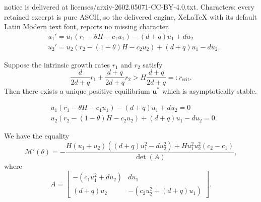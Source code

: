 \documentclass[10pt,a4paper]{amsart}
\def\MM{\mathcal{M}}
\begin{document}
notice is delivered at licenses/arxiv-2602.05071-CC-BY-4.0.txt. Characters: every retained excerpt is pure ASCII, so the delivered engine, XeLaTeX with its default Latin Modern text font, reports no missing character.
\begin{align}\label{eqn:ODEs_2patch}
    &u_1'=u_1(r_1-\theta H -c_1u_1) -(d+q)u_1+du_2\nonumber\\
    &u_2'=u_2(r_2-(1-\theta)H -c_2u_2)+(d+q)u_1-du_2.
\end{align}

\begin{lemma}\label{lem:persist}
    Suppose the intrinsic growth rates $r_1$ and $r_2$ satisfy
    \[
    \frac{d}{2d+q}r_1+\frac{d+q}{2d+q}r_2>H\frac{d+q}{2d+q} =: r_{\text{crit}}.
    \]
    Then there exists a unique  positive equilibrium $\bm u^*$ which is asymptotically stable.
\end{lemma}

\begin{align}
    &u_1(r_1-\theta H -c_1u_1) -(d+q)u_1+du_2=0\label{eqn:u1}\\
    &u_2(r_2-(1-\theta)H -c_2u_2)+(d+q)u_1-du_2=0\label{eqn:u2}.
\end{align}    

\begin{lemma}\label{lem:M'_hetero}
We have the equality
\begin{equation}\label{eq:M'_het}
    \MM'(\theta)= -\frac{H(u_1+u_2)((d+q)u_1^2-du_2^2)+Hu_1^2u_2^2(c_2-c_1)}{\det(A)},
\end{equation}
where 
\begin{equation}\label{matrix A_het}
A=\begin{bmatrix}
    -(c_1u_1^2+du_2) & du_1\\
    (d+q)u_2 & -(c_2u_2^2+(d+q)u_1)
\end{bmatrix}.
\end{equation}
\end{lemma}
\end{document}
